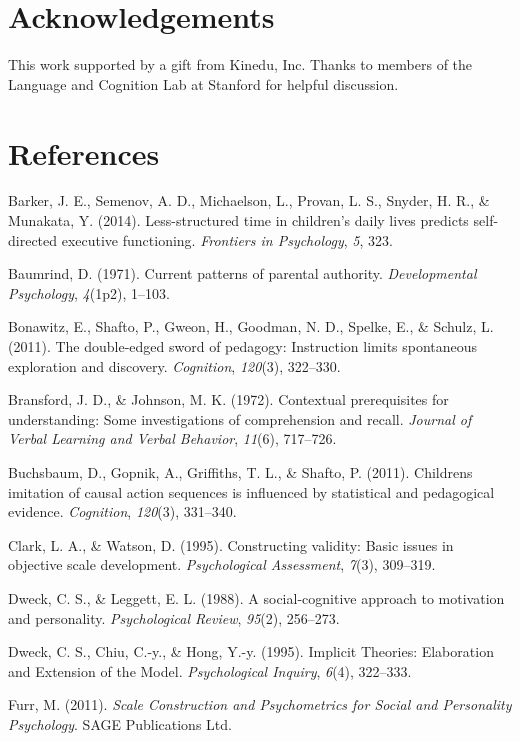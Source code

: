 \documentclass[10pt, letterpaper]{article}
\begin{document}
\section{Acknowledgements}\label{acknowledgements}

This work supported by a gift from Kinedu, Inc. Thanks to members of the
Language and Cognition Lab at Stanford for helpful discussion.

\section{References}\label{references}

\small

Barker, J. E., Semenov, A. D., Michaelson, L., Provan, L. S., Snyder, H.
R., \& Munakata, Y. (2014). Less-structured time in children's daily
lives predicts self-directed executive functioning. \emph{Frontiers in
Psychology}, \emph{5}, 323.

Baumrind, D. (1971). Current patterns of parental authority.
\emph{Developmental Psychology}, \emph{4}(1p2), 1--103.

Bonawitz, E., Shafto, P., Gweon, H., Goodman, N. D., Spelke, E., \&
Schulz, L. (2011). The double-edged sword of pedagogy: Instruction
limits spontaneous exploration and discovery. \emph{Cognition},
\emph{120}(3), 322--330.

Bransford, J. D., \& Johnson, M. K. (1972). Contextual prerequisites for
understanding: Some investigations of comprehension and recall.
\emph{Journal of Verbal Learning and Verbal Behavior}, \emph{11}(6),
717--726.

Buchsbaum, D., Gopnik, A., Griffiths, T. L., \& Shafto, P. (2011).
Childrens imitation of causal action sequences is influenced by
statistical and pedagogical evidence. \emph{Cognition}, \emph{120}(3),
331--340.

Clark, L. A., \& Watson, D. (1995). Constructing validity: Basic issues
in objective scale development. \emph{Psychological Assessment},
\emph{7}(3), 309--319.

Dweck, C. S., \& Leggett, E. L. (1988). A social-cognitive approach to
motivation and personality. \emph{Psychological Review}, \emph{95}(2),
256--273.

Dweck, C. S., Chiu, C.-y., \& Hong, Y.-y. (1995). Implicit Theories:
Elaboration and Extension of the Model. \emph{Psychological Inquiry},
\emph{6}(4), 322--333.

Furr, M. (2011). \emph{Scale Construction and Psychometrics for Social
and Personality Psychology}. SAGE Publications Ltd.
\end{document}
